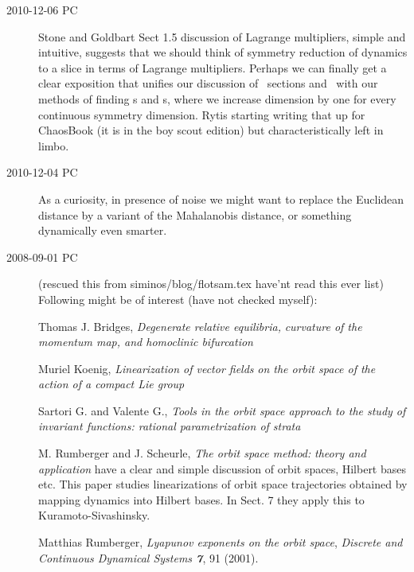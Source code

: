 \begin{description}
\item[2010-12-06 PC]
{Stone and Goldbart} Sect 1.5 discussion of Lagrange
multipliers, simple and intuitive, suggests that we should think of
symmetry reduction of dynamics to a slice in terms of Lagrange
multipliers. Perhaps we can finally get a clear exposition that unifies
our discussion of \Poincare\ sections and \reducedsp\ with our methods of
finding \po s and \rpo s, where we increase dimension by one for every
continuous symmetry dimension. Rytis starting writing that up for
ChaosBook (it is in the boy scout edition) but characteristically left in
limbo.

\item[2010-12-04 PC]
As a curiosity, in presence of noise we might want to replace the Euclidean
distance by a variant of the
{Mahalanobis distance}, or something dynamically even
smarter.

\item[2008-09-01 PC] (rescued this from siminos/blog/flotsam.tex
have'nt read this ever list)
Following might be of interest (have not checked myself):


\noindent
Thomas J. Bridges,
{\emph{Degenerate relative equilibria,}}
\emph{curvature of the momentum map, and homoclinic bifurcation}

Muriel Koenig,
{\emph{Linearization of vector fields}}
\emph{ on the orbit space of the action of a compact Lie group}

Sartori G. and Valente G.,
{\emph{Tools in the orbit space approach}}
\emph{to the study of invariant functions: rational parametrization of strata}

M. Rumberger and J. Scheurle,
{\emph{The orbit space method:}}
\emph{theory and application}
have a clear and simple discussion of orbit spaces,
Hilbert bases etc. This paper studies linearizations of orbit space
trajectories obtained by mapping dynamics into Hilbert bases.
In Sect. 7 they apply this to Kuramoto-Sivashinsky.


Matthias Rumberger,
{\emph{Lyapunov exponents on the orbit space}},
{\em Discrete and Continuous Dynamical Systems \bf 7}, 91 (2001). %


\end{description}
